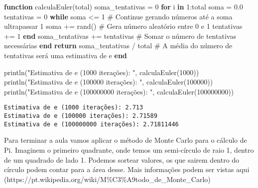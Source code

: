 \documentclass[
  letterpaper,
  DIV=11,
  numbers=noendperiod]{scrreprt}
\newenvironment{Shaded}{\begin{snugshade}}{\end{snugshade}}
\newcommand{\CommentTok}[1]{\textcolor[rgb]{0.37,0.37,0.37}{#1}}
\newcommand{\ControlFlowTok}[1]{\textcolor[rgb]{0.00,0.23,0.31}{\textbf{#1}}}
\newcommand{\FloatTok}[1]{\textcolor[rgb]{0.68,0.00,0.00}{#1}}
\newcommand{\FunctionTok}[1]{\textcolor[rgb]{0.28,0.35,0.67}{#1}}
\newcommand{\KeywordTok}[1]{\textcolor[rgb]{0.00,0.23,0.31}{\textbf{#1}}}
\newcommand{\NormalTok}[1]{\textcolor[rgb]{0.00,0.23,0.31}{#1}}
\newcommand{\OperatorTok}[1]{\textcolor[rgb]{0.37,0.37,0.37}{#1}}
\newcommand{\StringTok}[1]{\textcolor[rgb]{0.13,0.47,0.30}{#1}}
\begin{document}
\begin{Shaded}
\begin{Highlighting}[]
\KeywordTok{function} \FunctionTok{calculaEuler}\NormalTok{(total)}
\NormalTok{    soma\_tentativas }\OperatorTok{=} \FloatTok{0}
    \ControlFlowTok{for}\NormalTok{ i }\KeywordTok{in} \FloatTok{1}\OperatorTok{:}\NormalTok{total}
\NormalTok{        soma }\OperatorTok{=} \FloatTok{0.0}
\NormalTok{        tentativas }\OperatorTok{=} \FloatTok{0}      
        \ControlFlowTok{while}\NormalTok{ soma }\OperatorTok{\textless{}=} \FloatTok{1}   \CommentTok{\# Continue gerando números até a soma ultrapassar 1}
\NormalTok{            soma }\OperatorTok{+=} \FunctionTok{rand}\NormalTok{()     }\CommentTok{\# Gera número aleatório entre 0 e 1}
\NormalTok{            tentativas }\OperatorTok{+=} \FloatTok{1}
        \ControlFlowTok{end}        
\NormalTok{        soma\_tentativas }\OperatorTok{+=}\NormalTok{ tentativas     }\CommentTok{\# Somar o número de tentativas necessárias}
    \ControlFlowTok{end} 
    \ControlFlowTok{return}\NormalTok{ soma\_tentativas }\OperatorTok{/}\NormalTok{ total     }\CommentTok{\# A média do número de tentativas será uma estimativa de e}
\KeywordTok{end}

\FunctionTok{println}\NormalTok{(}\StringTok{"Estimativa de e (1000 iterações): "}\NormalTok{, }\FunctionTok{calculaEuler}\NormalTok{(}\FloatTok{1000}\NormalTok{))}
\FunctionTok{println}\NormalTok{(}\StringTok{"Estimativa de e (100000 iterações): "}\NormalTok{, }\FunctionTok{calculaEuler}\NormalTok{(}\FloatTok{100000}\NormalTok{))}
\FunctionTok{println}\NormalTok{(}\StringTok{"Estimativa de e (100000000 iterações): "}\NormalTok{, }\FunctionTok{calculaEuler}\NormalTok{(}\FloatTok{100000000}\NormalTok{))}
\end{Highlighting}
\end{Shaded}

\begin{verbatim}
Estimativa de e (1000 iterações): 2.713
Estimativa de e (100000 iterações): 2.71589
Estimativa de e (100000000 iterações): 2.71811446
\end{verbatim}

Para terminar a aula vamos aplicar o método de Monte Carlo para o
cálculo de Pi. Imaginem o primeiro quadrante, onde temos um semi-círculo
de raio 1, dentro de um quadrado de lado 1. Podemos sortear valores, os
que sairem dentro do círculo podem contar para a área desse. Mais
informações podem ser vistas aqui
(https://pt.wikipedia.org/wiki/M\%C3\%A9todo\_de\_Monte\_Carlo)
\end{document}
